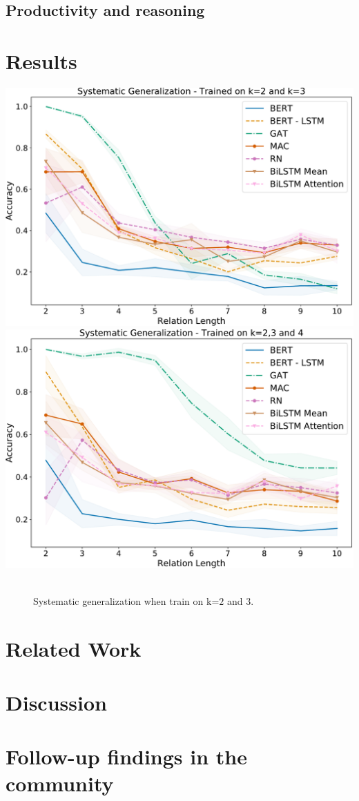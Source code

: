 \documentclass[letterpaper, 12pt]{report}
\begin{document}
\subsection{Productivity and reasoning}
\label{sec:orgefd9eef}
\section{Results}
\label{sec:org8bb5b76}

\begin{center}
\includegraphics[height=0.3\textwidth]{figs/clutrr/emnlp/sys_gen_23.pdf}
\includegraphics[height=0.3\textwidth]{figs/clutrr/emnlp/sys_gen_234.pdf}
\end{center}
\begin{figure}[htbp]
\centering
\includegraphics[height=0.0001in]{figs/empy_fig.png}
\caption{Systematic generalization when train on k=\(2\) and \(3\).}
\end{figure}


\section{Related Work}
\label{sec:org777df69}
\section{Discussion}
\label{sec:orgb3a0d20}
\section{Follow-up findings in the community}
\label{sec:org89d09b3}
\clearpage
\end{document}
